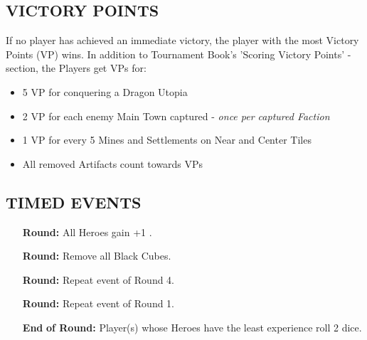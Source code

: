 \begin{multicols*}{2}
\subsection*{\MakeUppercase{Victory Points}}
If no player has achieved an immediate victory, the player with the most Victory Points (VP) wins. In addition to Tournament Book's 'Scoring Victory Points' -section, the Players get VPs for:

\begin{itemize}
 \item 5 VP for conquering a Dragon Utopia
 \item 2 VP for each enemy Main Town captured - \textit{once per captured Faction}
 \item 1 VP for every 5 Mines and Settlements on Near and Center Tiles
 \item All removed Artifacts count towards VPs
\end{itemize}

\subsection*{\MakeUppercase{Timed Events}}

\begin{itemize}
  \item[\textbf{\nth{1}}] \textbf{Round:} All Heroes gain +1 .
  \item[\textbf{\nth{4}}] \textbf{Round:} Remove all Black Cubes. %
  \item[\textbf{\nth{8}}] \textbf{Round:} Repeat event of Round 4.
  \item[\textbf{\nth{9}}] \textbf{Round:} Repeat event of Round 1.
  \item[\textbf{End}] \textbf{of  Round:} Player(s) whose Heroes have the least experience roll 2  dice.
\end{itemize}


\end{multicols*}
